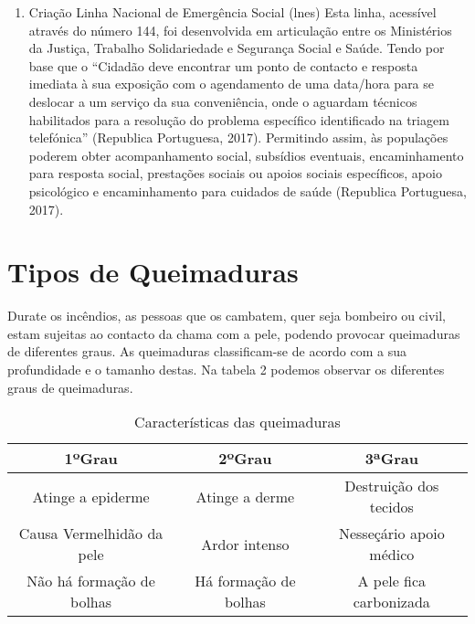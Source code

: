 \documentclass{report}
\begin{document}
\begin{enumerate}
\begin{itemize}
 \end{itemize}
 
 \item Criação Linha Nacional de Emergência Social (\ac{lnes})
  Esta linha, acessível através do número 144, foi desenvolvida em articulação entre os Ministérios da Justiça, Trabalho Solidariedade e Segurança Social e Saúde. Tendo por base que o “Cidadão deve encontrar um ponto de contacto e resposta imediata à sua exposição com o agendamento de uma data/hora para se deslocar a um serviço da sua conveniência, onde o aguardam técnicos habilitados para a resolução do problema específico identificado na triagem telefónica” (Republica Portuguesa, 2017). Permitindo assim, às populações poderem obter acompanhamento social, subsídios eventuais, encaminhamento para resposta social, prestações sociais ou apoios sociais específicos, apoio psicológico e encaminhamento para cuidados de saúde (Republica Portuguesa, 2017).


 \end{enumerate}

 
\chapter{Tipos de Queimaduras} 
\cite{dgsriscos}

Durate os incêndios, as pessoas que os cambatem, quer seja bombeiro ou civil,  estam sujeitas ao contacto da chama com a pele, podendo provocar queimaduras de diferentes graus.
As queimaduras classificam-se de acordo com a sua profundidade e o tamanho destas.
Na tabela 2 podemos observar os diferentes graus de queimaduras.

\begin{table}
\begin{tabular}{|c||c||c|}
\hline  
   \textbf{1ºGrau}	  	&  \textbf{2ºGrau}	  &  \textbf{3ªGrau}		 \\  \hline
   Atinge a epiderme		&  Atinge a derme         &  Destruição dos tecidos \\  \hline
   Causa Vermelhidão da pele   	&  Ardor intenso	  &  Nesseçário apoio médico \\  \hline
   Não há formação de bolhas    &  Há formação de bolhas  &  A pele fica carbonizada \\  \hline
\end{tabular}
\caption{Características das queimaduras}
\end{table}
 
\end{document}
